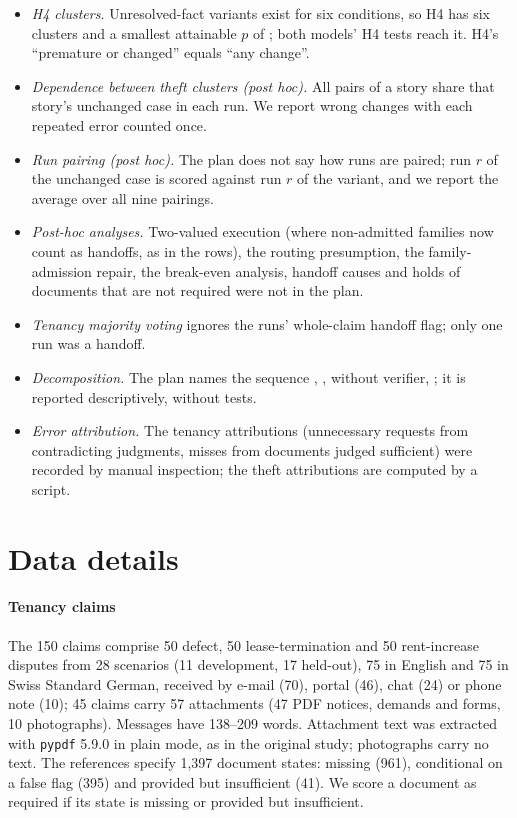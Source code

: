 \begin{itemize}[leftmargin=1.2em,itemsep=1pt]
\item \emph{H4 clusters.} Unresolved-fact variants exist for six conditions, so H4 has six clusters and a smallest attainable $p$ of \ptTerraHFourMinP; both models' H4 tests reach it. H4's ``premature or changed'' equals ``any change''.
\item \emph{Dependence between theft clusters (post hoc).} All pairs of a story share that story's unchanged case in each run. We report wrong changes with each repeated error counted once.
\item \emph{Run pairing (post hoc).} The plan does not say how runs are paired; run $r$ of the unchanged case is scored against run $r$ of the variant, and we report the average over all nine pairings.
\item \emph{Post-hoc analyses.} Two-valued execution (where non-admitted families now count as handoffs, as in the \casepath rows), the routing presumption, the family-admission repair, the break-even analysis, handoff causes and holds of documents that are not required were not in the plan.
\item \emph{Tenancy majority voting} ignores the runs' whole-claim handoff flag; only one run was a handoff.
\item \emph{Decomposition.} The plan names the sequence , , \casepath without verifier, \casepath; it is reported descriptively, without tests.
\item \emph{Error attribution.} The tenancy attributions (unnecessary requests from contradicting judgments, misses from documents judged sufficient) were recorded by manual inspection; the theft attributions are computed by a script.
\end{itemize}

\section{Data details}
\label{app:data}

\paragraph{Tenancy claims}
The 150 claims comprise 50 defect, 50 lease-termination and 50 rent-increase disputes from 28 scenarios (11 development, 17 held-out), 75 in English and 75 in Swiss Standard German, received by e-mail (70), portal (46), chat (24) or phone note (10); 45 claims carry 57 attachments (47 PDF notices, demands and forms, 10 photographs). Messages have 138--209 words. Attachment text was extracted with \texttt{pypdf} 5.9.0 in plain mode, as in the original study; photographs carry no text. The references specify 1,397 document states: missing (961), conditional on a false flag (395) and provided but insufficient (41). We score a document as required if its state is missing or provided but insufficient.

